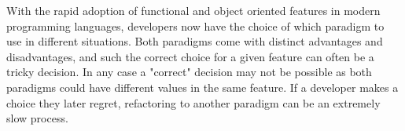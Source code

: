 \documentclass[ oneside,%
                    author={James Elgar},
                    degree={MEng},
                     title={Bidirectional transformer between functional and \\ object-oriented programming in Rust},
                  subtitle={}]{dissertation}
\begin{document}

 



\noindent
With the rapid adoption of functional and object oriented features in modern programming languages, developers now have the choice of which paradigm to use in different situations. Both paradigms come with distinct advantages and disadvantages, and such the correct choice for a given feature can often be a tricky decision. In any case a "correct" decision may not be possible as both paradigms could have different values in the same feature. If a developer makes a choice they later regret, refactoring to another paradigm can be an extremely slow process.
\end{document}
